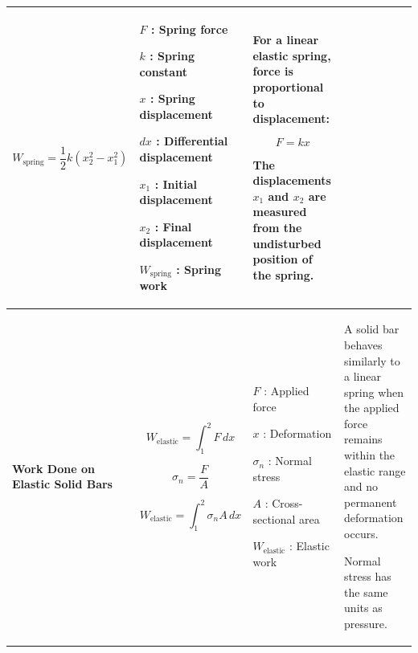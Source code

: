 \documentclass[12pt]{article}
\begin{document}
\begin{center}
\begin{tabular}{|p{3.2cm}|p{5.2cm}|p{5.0cm}|p{5.0cm}|}
\begin{equation*}
W_{\mathrm{spring}}
=
\frac{1}{2}k(x_2^2-x_1^2)
\end{equation*}
&
$F$ : Spring force

$k$ : Spring constant

$x$ : Spring displacement

$dx$ : Differential displacement

$x_1$ : Initial displacement

$x_2$ : Final displacement

$W_{\mathrm{spring}}$ : Spring work
&
For a linear elastic spring, force is proportional to displacement:

\begin{equation*}
F=kx
\end{equation*}

The displacements $x_1$ and $x_2$ are measured from the undisturbed position of the spring.
\\
\hline

\textbf{Work Done on Elastic Solid Bars}
&
\begin{equation*}
W_{\mathrm{elastic}}
=
\int_1^2 F\,dx
\end{equation*}

\begin{equation*}
\sigma_n=\frac{F}{A}
\end{equation*}

\begin{equation*}
W_{\mathrm{elastic}}
=
\int_1^2 \sigma_n A\,dx
\end{equation*}
&
$F$ : Applied force

$x$ : Deformation

$\sigma_n$ : Normal stress

$A$ : Cross-sectional area

$W_{\mathrm{elastic}}$ : Elastic work
&
A solid bar behaves similarly to a linear spring when the applied force remains within the elastic range and no permanent deformation occurs.

Normal stress has the same units as pressure.
\\
\hline

\end{tabular}
\end{center}
\end{document}
